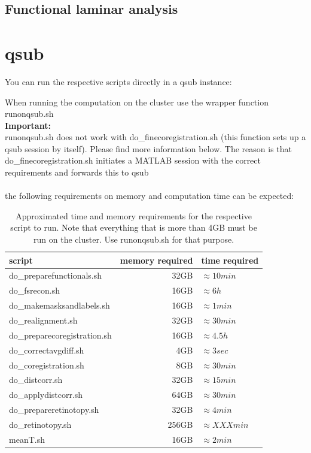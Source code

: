 \documentclass[12pt,a4paper]{scrartcl}
\begin{document}
\subsection{Functional laminar analysis}

\section{qsub}
You can run the respective scripts directly in a qsub instance:

\noindent When running the computation on the cluster use the wrapper function runonqsub.sh\\

\noindent \textbf{Important:}\\
\noindent runonqsub.sh does not work with do\_finecoregistration.sh (this function sets up a qsub session by itself). Please find more information below. The reason is that do\_finecoregistration.sh initiates a MATLAB session with the correct requirements and forwards this to qsub\\\\
\noindent the following requirements on memory and computation time can be expected:

\begin{table}[h]
\centering
\begin{tabular}{l | r | l}
\toprule
script & memory required & time required\\\hline
	do\_preparefunctionals.sh & 32GB & $\approx 10min$ \\\hline
	do\_fsrecon.sh & 16GB & $\approx 6h$ \\\hline
	do\_makemasksandlabels.sh & 16GB & $\approx 1min$ \\\hline
	do\_realignment.sh & 32GB & $\approx 30min$ \\\hline
	do\_preparecoregistration.sh & 16GB & $\approx 4.5h$ \\\hline
	do\_correctavgdiff.sh & 4GB & $\approx 3sec$ \\\hline
	do\_coregistration.sh & 8GB & $\approx 30min$ \\\hline
	do\_distcorr.sh & 32GB & $\approx 15min$ \\\hline
	do\_applydistcorr.sh & 64GB & $\approx 30min$ \\\hline
	do\_prepareretinotopy.sh & 32GB & $\approx 4min$ \\\hline
	do\_retinotopy.sh & 256GB & $\approx XXXmin$ \\\hline
	meanT.sh & 16GB & $\approx 2min$ \\\bottomrule
\end{tabular}
\caption[Approximated time and memory requirements when running on qsub]{Approximated time and memory requirements for the respective script to run. Note that everything that is more than 4GB must be run on the cluster. Use runonqsub.sh for that purpose.}
\label{tab:hardwarerequirements}
\end{table}
\end{document}
